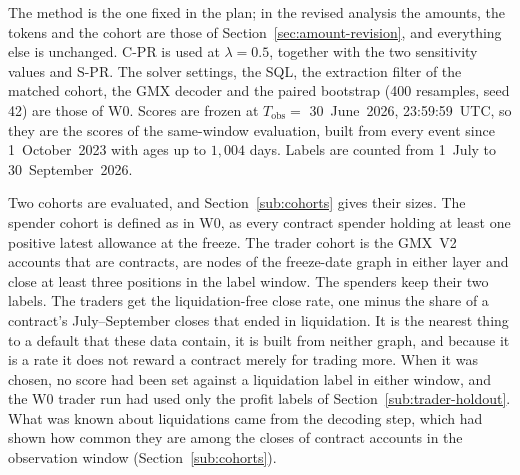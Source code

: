The method is the one fixed in the plan; in the revised analysis the amounts, the tokens and the cohort are those of Section~\ref{sec:amount-revision}, and everything else is unchanged. C-PR is used at $\lambda=0.5$, together with the two sensitivity values and S-PR. The solver settings, the SQL, the extraction filter of the matched cohort, the GMX decoder and the paired bootstrap (400 resamples, seed 42) are those of W0. Scores are frozen at $T_{\mathrm{obs}}=$ 30~June~2026, 23:59:59~UTC, so they are the scores of the same-window evaluation, built from every event since 1~October~2023 with ages up to $1{,}004$ days. Labels are counted from 1~July to 30~September~2026.

Two cohorts are evaluated, and Section~\ref{sub:cohorts} gives their sizes. The spender cohort is defined as in W0, as every contract spender holding at least one positive latest allowance at the freeze. The trader cohort is the GMX~V2 accounts that are contracts, are nodes of the freeze-date graph in either layer and close at least three positions in the label window. The spenders keep their two labels. The traders get the liquidation-free close rate, one minus the share of a contract's July--September closes that ended in liquidation. It is the nearest thing to a default that these data contain, it is built from neither graph, and because it is a rate it does not reward a contract merely for trading more. When it was chosen, no score had been set against a liquidation label in either window, and the W0 trader run had used only the profit labels of Section~\ref{sub:trader-holdout}. What was known about liquidations came from the decoding step, which had shown how common they are among the closes of contract accounts in the observation window (Section~\ref{sub:cohorts}).

